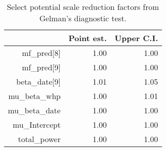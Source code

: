 \begin{table}[h]
\centering
\begin{tabular}{rrr}
  \hline
 & Point est. & Upper C.I. \\ 
  \hline
mf\_pred[8] & 1.00 & 1.00 \\ 
  mf\_pred[9] & 1.00 & 1.00 \\ 
  beta\_date[9] & 1.01 & 1.05 \\ 
  mu\_beta\_whp & 1.00 & 1.01 \\ 
  mu\_beta\_date & 1.00 & 1.00 \\ 
  mu\_Intercept & 1.00 & 1.00 \\ 
  total\_power & 1.00 & 1.00 \\ 
   \hline
\end{tabular}
\caption{Select potential scale reduction factors from Gelman's diagnostic test.} 
\label{tab:gelman}
\end{table}

